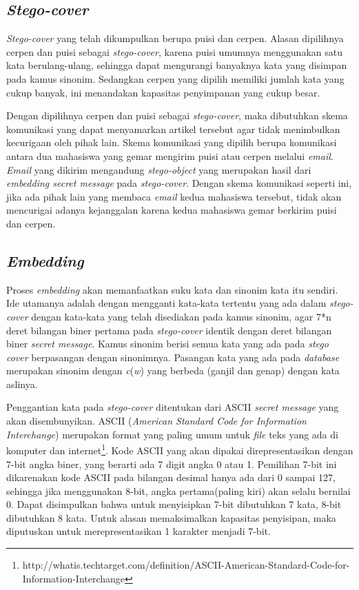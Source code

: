 \subsection{\textit{Stego-cover}}
\textit{Stego-cover} yang telah dikumpulkan berupa puisi dan cerpen. Alasan dipilihnya cerpen dan puisi sebagai \textit{stego-cover}, karena puisi umumnya menggunakan satu kata berulang-ulang, sehingga dapat mengurangi banyaknya kata yang disimpan pada kamus sinonim. Sedangkan cerpen yang dipilih memiliki jumlah kata yang cukup banyak, ini menandakan kapasitas penyimpanan yang cukup besar.

Dengan dipilihnya cerpen dan puisi sebagai \textit{stego-cover}, maka dibutuhkan skema komunikasi yang dapat menyamarkan artikel tersebut agar tidak menimbulkan kecurigaan oleh pihak lain. Skema komunikasi yang dipilih berupa komunikasi antara dua mahasiswa yang gemar mengirim puisi atau cerpen melalui \textit{email}. \textit{Email} yang dikirim mengandung \textit{stego-object} yang merupakan hasil dari \textit{embedding secret message} pada \textit{stego-cover}. Dengan skema komunikasi seperti ini, jika ada pihak lain yang membaca \textit{email} kedua mahasiswa tersebut, tidak akan mencurigai adanya kejanggalan karena kedua mahasiswa gemar berkirim puisi dan cerpen.

\subsection{\textit{Embedding}}
Proses \textit{embedding} akan memanfaatkan suku kata dan sinonim kata itu sendiri. Ide utamanya adalah dengan mengganti kata-kata tertentu yang ada dalam \textit{stego-cover} dengan kata-kata yang telah disediakan pada kamus sinonim, agar 7*n deret bilangan biner pertama pada \textit{stego-cover} identik dengan deret bilangan biner \textit{secret message}. Kamus sinonim berisi semua kata yang ada pada \textit{stego cover} berpasangan dengan sinonimnya. Pasangan kata yang ada pada \textit{database} merupakan sinonim dengan \textit{c}(\textit{w}) yang berbeda (ganjil dan genap) dengan kata aslinya.

Penggantian kata pada \textit{stego-cover} ditentukan dari ASCII \textit{secret message} yang akan disembunyikan. ASCII (\textit{American Standard Code for Information Interchange}) merupakan format yang paling umum untuk \textit{file} teks yang ada di komputer dan internet\footnote{http://whatis.techtarget.com/definition/ASCII-American-Standard-Code-for-Information-Interchange}. Kode ASCII yang akan dipakai direpresentasikan dengan 7-bit angka biner, yang berarti ada 7 digit angka 0 atau 1. Pemilihan 7-bit ini dikarenakan kode ASCII pada bilangan desimal hanya ada dari 0 sampai 127, sehingga jika menggunakan 8-bit, angka pertama(paling kiri) akan selalu bernilai 0. Dapat disimpulkan bahwa untuk menyisipkan 7-bit dibutuhkan 7 kata, 8-bit dibutuhkan 8 kata.  Untuk alasan memaksimalkan kapasitas penyisipan, maka diputuskan untuk merepresentasikan 1 karakter menjadi 7-bit.

